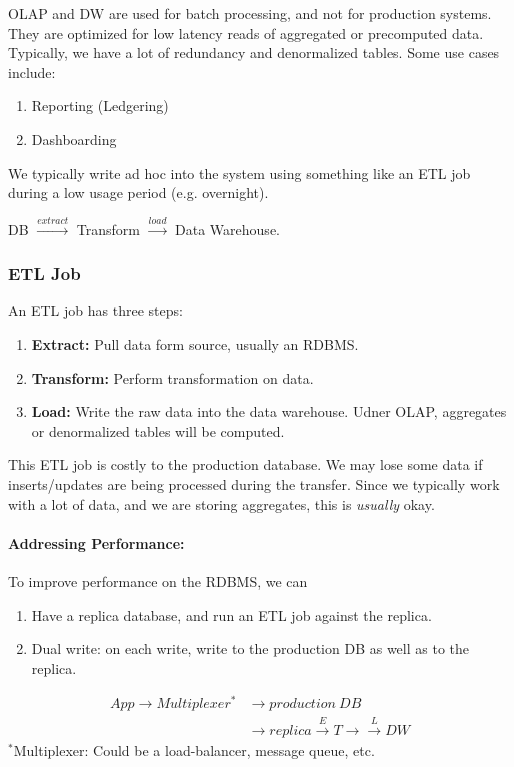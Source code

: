 \documentclass{report}
\renewcommand{\bf}[1]{\textbf{{#1}}}
\renewcommand{\it}[1]{\textit{{#1}}}
\begin{document}
OLAP and DW are used for batch processing, and not for production systems. They are optimized for
low latency reads of aggregated or precomputed data. Typically, we have a lot of redundancy and
denormalized tables. Some use cases include:
\begin{enumerate}
    \item Reporting (Ledgering)
    \item Dashboarding
\end{enumerate}
We typically write ad hoc into the system using something like an ETL job during a low usage period
(e.g. overnight).
\begin{center}
    DB $\overset{extract}{\longrightarrow}$ Transform $\overset{load}{\longrightarrow}$ Data Warehouse.
\end{center}

\subsubsection{ETL Job}
An ETL job has three steps:
\begin{enumerate}
    \item \bf{Extract:} Pull data form source, usually an RDBMS.
    \item \bf{Transform:} Perform transformation on data.
    \item \bf{Load:} Write the raw data into the data warehouse. Udner OLAP, aggregates or
        denormalized tables will be computed.
\end{enumerate}
This ETL job is costly to the production database. We may lose some data if inserts/updates are
being processed during the transfer. Since we typically work with a lot of data, and we are storing
aggregates, this is \it{usually} okay.

\paragraph{Addressing Performance:}
To improve performance on the RDBMS, we can 

\begin{enumerate}
    \item Have a replica database, and run an ETL job against the replica.
    \item Dual write: on each write, write to the production DB as well as to the replica.
\end{enumerate}

\begin{align*}
    App \longrightarrow Multiplexer^* &\longrightarrow production \ DB \\
                                      &\longrightarrow replica \overset{E}{\to} T \to
                                      \overset{L}{\to} DW
\end{align*}
$^*$Multiplexer: Could be a load-balancer, message queue, etc.
\vspace{1em}
\end{document}
